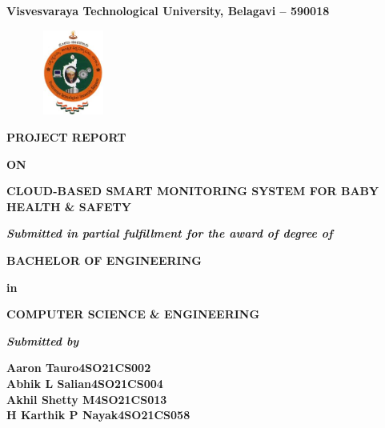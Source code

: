 \documentclass[12pt,a4paper]{report}
\begin{document}
\pagestyle{empty}
\begin{center}

  {\large \textbf{Visvesvaraya Technological University, Belagavi – 590018}}
  \begin{figure}[hbtp]
    \centering
    \includegraphics[width=2.3cm,height=2.8cm]{./pic/vtu}
  \end{figure}
 
  \textbf{PROJECT REPORT}
  \par
  \textbf{ON}
  \par
  \vspace{6pt}
  {\Large \textbf{CLOUD-BASED SMART MONITORING SYSTEM FOR BABY HEALTH \& SAFETY}}
  \par
  \vspace{12pt}
  \par
  \textit{\textbf{Submitted in partial fulfillment for the award of degree of}}
  \par
  \vspace{12pt}
  \large \textbf{BACHELOR OF ENGINEERING }
  \par
  \textbf{in}
  \par
  \large \textbf{COMPUTER SCIENCE \& ENGINEERING}
  \par
  \vspace{12pt}
  \textit{\textbf{Submitted by}}
  \vspace{8pt}

  \textbf{\large Aaron Tauro}\qquad \qquad \qquad \qquad \textbf{\large 4SO21CS002}\\ \vspace{3pt} 
  \textbf{\large Abhik L Salian}\qquad \qquad \qquad \qquad \textbf{\large 4SO21CS004}\\ \vspace{3pt}
  \textbf{\large Akhil Shetty M}\qquad \qquad \qquad \qquad \textbf{\large 4SO21CS013}\\ \vspace{3pt}
  \textbf{\large H Karthik P Nayak}\qquad \qquad \qquad \qquad \textbf{\large 4SO21CS058}\\ \vspace{3pt}


\end{center}
\end{document}
